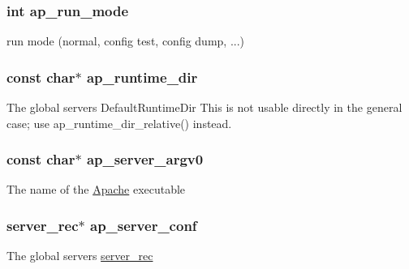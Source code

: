 \subsubsection[{\texorpdfstring{ap\+\_\+run\+\_\+mode}{ap_run_mode}}]{ {\bf int} ap\+\_\+run\+\_\+mode}\hypertarget{group__APACHE__CORE__MAIN_ga41e1a7a19bc534c1da2de0b00c887ce8}{}\label{group__APACHE__CORE__MAIN_ga41e1a7a19bc534c1da2de0b00c887ce8}
run mode (normal, config test, config dump, ...) 
\subsubsection[{\texorpdfstring{ap\+\_\+runtime\+\_\+dir}{ap_runtime_dir}}]{ const char$\ast$ ap\+\_\+runtime\+\_\+dir}\hypertarget{group__APACHE__CORE__MAIN_ga644dd63e382a8aa0c0db473567f0fac9}{}\label{group__APACHE__CORE__MAIN_ga644dd63e382a8aa0c0db473567f0fac9}
The global server\textquotesingle{}s Default\+Runtime\+Dir This is not usable directly in the general case; use ap\+\_\+runtime\+\_\+dir\+\_\+relative() instead. 
\subsubsection[{\texorpdfstring{ap\+\_\+server\+\_\+argv0}{ap_server_argv0}}]{ const char$\ast$ ap\+\_\+server\+\_\+argv0}\hypertarget{group__APACHE__CORE__MAIN_ga3b9f35b41e580b91b496512555d1f3b6}{}\label{group__APACHE__CORE__MAIN_ga3b9f35b41e580b91b496512555d1f3b6}
The name of the \hyperlink{namespaceApache}{Apache} executable 
\subsubsection[{\texorpdfstring{ap\+\_\+server\+\_\+conf}{ap_server_conf}}]{ {\bf server\+\_\+rec}$\ast$ ap\+\_\+server\+\_\+conf}\hypertarget{group__APACHE__CORE__MAIN_ga86736bfc3688ce1b25b1455f24fe740f}{}\label{group__APACHE__CORE__MAIN_ga86736bfc3688ce1b25b1455f24fe740f}
The global server\textquotesingle{}s \hyperlink{structserver__rec}{server\+\_\+rec} 
